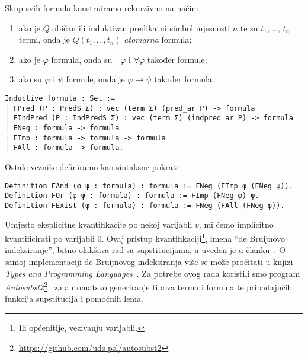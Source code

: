 \begin{definition}[Formula]\label{def:formula}
  Skup svih formula konstruiramo rekurzivno na način:
  \begin{enumerate}
  \item ako je \(Q\) običan ili induktivan predikatni simbol mjesnosti \(n\) te su \(t_{1}\), \ldots, \(t_{n}\) termi,
    onda je \(Q(t_{1}, \ldots, t_{n})\) \textit{atomarna} formula;
  \item ako je \(\varphi\) formula, onda su \(\neg\varphi\) i \(\forall\varphi\) također formule;
  \item ako su \(\varphi\) i \(\psi\) formule, onda je \(\varphi \rightarrow \psi\) također formula.
  \end{enumerate}
\begin{verbatim}
Inductive formula : Set :=
| FPred (P : PredS Σ) : vec (term Σ) (pred_ar P) -> formula 
| FIndPred (P : IndPredS Σ) : vec (term Σ) (indpred_ar P) -> formula 
| FNeg : formula -> formula 
| FImp : formula -> formula -> formula 
| FAll : formula -> formula.
\end{verbatim}
  \noindent Ostale veznike definiramo kao sintaksne pokrate.
\begin{verbatim}
Definition FAnd (φ ψ : formula) : formula := FNeg (FImp φ (FNeg ψ)).
Definition FOr (φ ψ : formula) : formula := FImp (FNeg φ) ψ.
Definition FExist (φ : formula) : formula := FNeg (FAll (FNeg φ)).
\end{verbatim}
\end{definition}
Umjesto eksplicitne kvantifikacije po nekoj varijabli \(v\),
mi ćemo implicitno kvantificirati po varijabli \(0\).
Ovaj pristup kvantifikaciji\footnote{Ili općenitije, vezivanju varijabli.}, imena \enquote{de Bruijnovo indeksiranje},
bitno olakšava rad sa supstitucijama, a uveden je u članku~\cite{debruijnamelessdummies}.
O samoj implementaciji de Bruijnovog indeksiranja više se može pročitati u knjizi
\textit{Types and Programming Languages}~\cite{pierce2002tapl}.
Za potrebe ovog rada koristili smo program \textit{Autosubst2}\footnote{\url{https://github.com/uds-psl/autosubst2}}~\cite{stark-phd,autosubst2}
za automatsko generiranje tipova terma i formula te pripadajućih funkcija supstitucija i pomoćnih lema.

